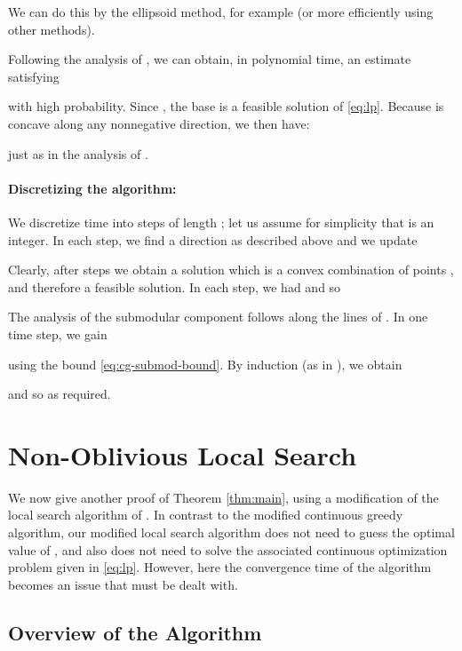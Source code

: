 \documentclass{article}
\theoremstyle{definition}
\begin{document}
We can do this by the ellipsoid method, for example (or more efficiently using other methods).

Following the analysis of \cite{Calinescu2011}, we can obtain, in polynomial time, an estimate satisfying

with high probability.  Since , the base  is a feasible solution of \eqref{eq:lp}.  Because  is concave along any nonnegative direction, we then have:

just as in the analysis of \cite{Calinescu2011}.

\paragraph{Discretizing the algorithm:}
We discretize time into steps of length ; let us assume for simplicity that  is an integer.
In each step, we find a direction  as described above and we update

Clearly, after  steps we obtain a solution  which is a convex combination of points , and therefore a feasible solution. In each step, we had  and so

The analysis of the submodular component follows along the lines of \cite{Calinescu2011}.  In one time step, we gain

using the bound \eqref{eq:cg-submod-bound}. By induction (as in \cite{Calinescu2011}), we obtain

and so  as required.


\section{Non-Oblivious Local Search}
\label{sec:non-oblivious-local}

We now give another proof of Theorem \ref{thm:main}, using a modification of the local search algorithm of \cite{Filmus2014}.  In contrast to the modified continuous greedy algorithm, our modified local search algorithm does not need to guess the optimal value of , and also does not need to solve the associated continuous optimization problem given in \eqref{eq:lp}.  However, here the convergence time of the algorithm becomes an issue that must be dealt with.

\subsection{Overview of the Algorithm}
\label{sec:overv-non-obliv}
\end{document}
